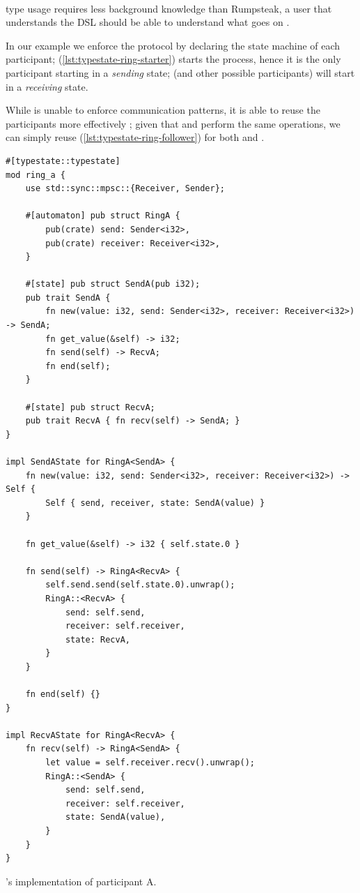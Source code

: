 \paragraph{} type usage requires less background knowledge than Rumpsteak,
a user that understands the \gls{DSL} should be able to understand what goes on .

In our example we enforce the protocol by declaring the state machine of each participant;
 (\autoref{lst:typestate-ring-starter}) starts the process,
hence it is the only participant starting in a \emph{sending} state;
 (and other possible participants) will start in a \emph{receiving} state.

While  is unable to enforce communication patterns,
it is able to reuse the participants more effectively ;
given that  and  perform the same operations, we can simply reuse  (\autoref{lst:typestate-ring-follower})
for both  and .


\begin{listing}
    \begin{verbatim}
#[typestate::typestate]
mod ring_a {
    use std::sync::mpsc::{Receiver, Sender};

    #[automaton] pub struct RingA {
        pub(crate) send: Sender<i32>,
        pub(crate) receiver: Receiver<i32>,
    }

    #[state] pub struct SendA(pub i32);
    pub trait SendA {
        fn new(value: i32, send: Sender<i32>, receiver: Receiver<i32>) -> SendA;
        fn get_value(&self) -> i32;
        fn send(self) -> RecvA;
        fn end(self);
    }

    #[state] pub struct RecvA;
    pub trait RecvA { fn recv(self) -> SendA; }
}

impl SendAState for RingA<SendA> {
    fn new(value: i32, send: Sender<i32>, receiver: Receiver<i32>) -> Self {
        Self { send, receiver, state: SendA(value) }
    }

    fn get_value(&self) -> i32 { self.state.0 }

    fn send(self) -> RingA<RecvA> {
        self.send.send(self.state.0).unwrap();
        RingA::<RecvA> {
            send: self.send,
            receiver: self.receiver,
            state: RecvA,
        }
    }

    fn end(self) {}
}

impl RecvAState for RingA<RecvA> {
    fn recv(self) -> RingA<SendA> {
        let value = self.receiver.recv().unwrap();
        RingA::<SendA> {
            send: self.send,
            receiver: self.receiver,
            state: SendA(value),
        }
    }
}
    \end{verbatim}
    \caption{'s implementation of participant A.}
    \label{lst:typestate-ring-starter}
\end{listing}

